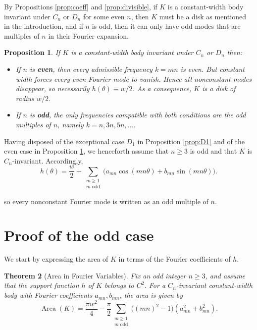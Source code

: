 \documentclass[11pt,letterpaper,reqno]{amsart}
\newtheorem{theorem}{Theorem}[section]
\newtheorem{proposition}[theorem]{Proposition}
\begin{document}
By Propositions \ref{prop:coeff} and \ref{prop:divisible}, if $K$ is a constant-width body invariant under $C_n$ or $D_n$ for some even $n$, then $K$ must be a disk as mentioned in the introduction, and if $n$ is odd, then it can only have odd modes that are multiples of $n$ in their Fourier expansion.

\begin{proposition}
    \label{prop:even-odd-modes}
If $K$ is a constant-width body invariant under $C_n$ or $D_n$ then:
\begin{itemize}
    \item If $n$ is \textbf{even}, then every admissible frequency $k=mn$ is even. But constant width forces every even Fourier mode to vanish. Hence all nonconstant modes disappear, so necessarily $h(\theta)\equiv w/2$. As a consequence, $K$ is a disk of radius $w/2$.
    \item If $n$ is \textbf{odd}, the only frequencies compatible with both conditions are the odd multiples of $n$, namely $k=n,3n,5n,\dots$.
\end{itemize}
\end{proposition}

Having disposed of the exceptional case $D_1$ in Proposition \ref{prop:D1} and of the even case in Proposition \ref{prop:even-odd-modes}, we henceforth assume that $n\ge3$ is odd and that $K$ is $C_n$-invariant. Accordingly,
\[
h(\theta)=\frac{w}{2}+\sum_{\substack{m\ge1\\m\text{ odd}}}\bigl(a_{mn}\cos(mn\theta)+b_{mn}\sin(mn\theta)\bigr).
\]
\begin{explanation}
    so every nonconstant Fourier mode is written as an odd multiple of $n$.
\end{explanation}


\section{Proof of the odd case}
We start by expressing the area of $K$ in terms of the Fourier coefficients of $h$.

\begin{theorem}[Area in Fourier Variables]
\label{thm:F-area}
    Fix an odd integer $n\ge3$, and assume that the support function $h$ of $K$ belongs to $C^2$. For a $C_n$-invariant constant-width body with Fourier coefficients $a_{mn}, b_{mn}$, the area is given by
\[
\operatorname{Area}(K)
=
\frac{\pi w^2}{4}
-
\frac{\pi}{2}
\sum_{\substack{m\ge1\\ m\text{ odd}}}
\bigl((mn)^2-1\bigr)(a_{mn}^2+b_{mn}^2).
\]
\end{theorem}
\end{document}
